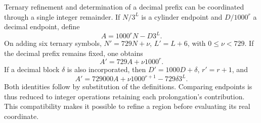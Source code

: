 Ternary refinement and determination of a decimal prefix can be
coordinated through a single integer remainder. If \(N/3^L\)
is a cylinder endpoint and \(D/1000^r\) a decimal endpoint, define
\[
 A=1000^rN-D3^L.
\]
On adding six ternary symbols, \(N'=729N+\nu\),
\(L'=L+6\), with \(0\le\nu<729\). If the decimal prefix remains
fixed, one obtains
\[
 A'=729A+\nu1000^r.
\]
If a decimal block \(\delta\) is also incorporated, then
\(D'=1000D+\delta\), \(r'=r+1\), and
\begin{equation}
 A'=729000A+\nu1000^{r+1}-729\delta3^L.
 \label{eq:residuo-dos-bases}
\end{equation}
Both identities follow by substitution of the definitions. Comparing
endpoints is thus reduced to integer operations retaining each
prolongation's contribution. This compatibility makes it possible
to refine a region before evaluating its real coordinate.
